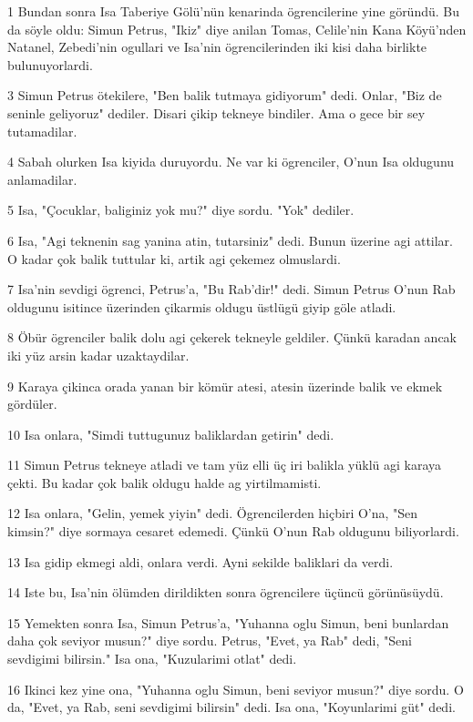 \par 1 Bundan sonra Isa Taberiye Gölü'nün kenarinda ögrencilerine yine göründü. Bu da söyle oldu: Simun Petrus, "Ikiz" diye anilan Tomas, Celile'nin Kana Köyü'nden Natanel, Zebedi'nin ogullari ve Isa'nin ögrencilerinden iki kisi daha birlikte bulunuyorlardi.
\par 3 Simun Petrus ötekilere, "Ben balik tutmaya gidiyorum" dedi. Onlar, "Biz de seninle geliyoruz" dediler. Disari çikip tekneye bindiler. Ama o gece bir sey tutamadilar.
\par 4 Sabah olurken Isa kiyida duruyordu. Ne var ki ögrenciler, O'nun Isa oldugunu anlamadilar.
\par 5 Isa, "Çocuklar, baliginiz yok mu?" diye sordu. "Yok" dediler.
\par 6 Isa, "Agi teknenin sag yanina atin, tutarsiniz" dedi. Bunun üzerine agi attilar. O kadar çok balik tuttular ki, artik agi çekemez olmuslardi.
\par 7 Isa'nin sevdigi ögrenci, Petrus'a, "Bu Rab'dir!" dedi. Simun Petrus O'nun Rab oldugunu isitince üzerinden çikarmis oldugu üstlügü giyip göle atladi.
\par 8 Öbür ögrenciler balik dolu agi çekerek tekneyle geldiler. Çünkü karadan ancak iki yüz arsin kadar uzaktaydilar.
\par 9 Karaya çikinca orada yanan bir kömür atesi, atesin üzerinde balik ve ekmek gördüler.
\par 10 Isa onlara, "Simdi tuttugunuz baliklardan getirin" dedi.
\par 11 Simun Petrus tekneye atladi ve tam yüz elli üç iri balikla yüklü agi karaya çekti. Bu kadar çok balik oldugu halde ag yirtilmamisti.
\par 12 Isa onlara, "Gelin, yemek yiyin" dedi. Ögrencilerden hiçbiri O'na, "Sen kimsin?" diye sormaya cesaret edemedi. Çünkü O'nun Rab oldugunu biliyorlardi.
\par 13 Isa gidip ekmegi aldi, onlara verdi. Ayni sekilde baliklari da verdi.
\par 14 Iste bu, Isa'nin ölümden dirildikten sonra ögrencilere üçüncü görünüsüydü.
\par 15 Yemekten sonra Isa, Simun Petrus'a, "Yuhanna oglu Simun, beni bunlardan daha çok seviyor musun?" diye sordu. Petrus, "Evet, ya Rab" dedi, "Seni sevdigimi bilirsin." Isa ona, "Kuzularimi otlat" dedi.
\par 16 Ikinci kez yine ona, "Yuhanna oglu Simun, beni seviyor musun?" diye sordu. O da, "Evet, ya Rab, seni sevdigimi bilirsin" dedi. Isa ona, "Koyunlarimi güt" dedi.
